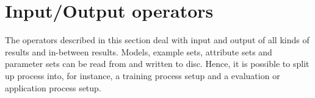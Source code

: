 \section{Input/Output operators}

The operators described in this section deal with input and output of
all kinds of results and in-between results. Models, example sets,
attribute sets and parameter sets can be read from and written to
disc. Hence, it is possible to split up process into, for
instance, a training process setup and a evaluation or application
process setup.
